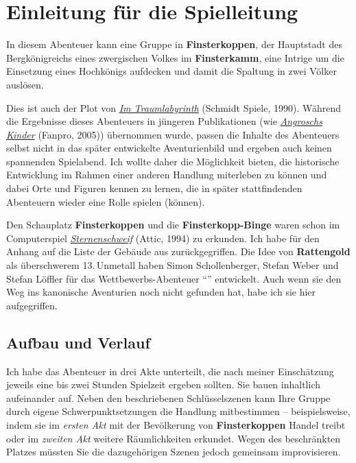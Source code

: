 \spaltenanfang


\section*{Einleitung für die Spielleitung}
In diesem Abenteuer kann eine Gruppe in \textbf{Finsterkoppen},
der Hauptstadt des Bergkönigreichs eines zwergischen Volkes im \textbf{Finsterkamm},
eine Intrige um die Einsetzung eines Hochkönigs aufdecken und damit die Spaltung in zwei Völker auslösen.

Dies ist auch der Plot von \emph{\href{https://de.wiki-aventurica.de/wiki/Im_Traumlabyrinth}{Im Traumlabyrinth}} (Schmidt Spiele, 1990).
Während die Ergebnisse dieses Abenteuers in jüngeren Publikationen (wie \emph{\href{https://de.wiki-aventurica.de/wiki/Angroschs_Kinder}{Angroschs Kinder}} (Fanpro, 2005))
übernommen wurde, passen die Inhalte des Abenteuers selbst nicht in das später entwickelte Aven\-turien\-bild und ergeben auch keinen spannenden Spielabend.
Ich wollte daher die Möglichkeit bieten, die historische Entwicklung im Rahmen einer anderen Handlung miterleben zu können
und dabei Orte und Figuren kennen zu lernen, die in später stattfindenden Abenteuern wieder eine Rolle spielen (können).

Den Schauplatz \textbf{Finsterkoppen} und die \textbf{Finsterkopp-Binge} waren schon im Computerspiel \emph{\href{https://de.wiki-aventurica.de/wiki/Sternenschweif_(1994)}{Sternenschweif}} (Attic, 1994) zu erkunden. %
Ich habe für den Anhang auf die Liste der Gebäude aus  zurückgegriffen.
Die Idee von \textbf{Rattengold} als überschwerem 13.\,Unmetall haben Simon Schollenberger, Stefan Weber und Stefan Löffler für das Wettbewerbs-Abenteuer \enquote{} entwickelt.
Auch wenn sie den Weg ins kanonische Aventurien noch nicht gefunden hat, habe ich sie hier aufgegriffen.


\subsection*{Aufbau und Verlauf}
Ich habe das Abenteuer in drei Akte unterteilt, die nach meiner Einschätzung jeweils eine bis zwei Stunden Spielzeit ergeben sollten.
Sie bauen inhaltlich aufeinander auf.
Neben den beschriebenen Schlüsselszenen kann Ihre Gruppe durch eigene Schwerpunktsetzungen die Handlung mitbestimmen -- beispielsweise,
indem sie im \emph{ersten Akt} mit der Bevölkerung von \textbf{Finsterkoppen} Handel treibt oder im \emph{zweiten Akt} weitere Räumlichkeiten erkundet.
Wegen des beschränkten Platzes müssten Sie die dazugehörigen Szenen jedoch gemeinsam improvisieren.

